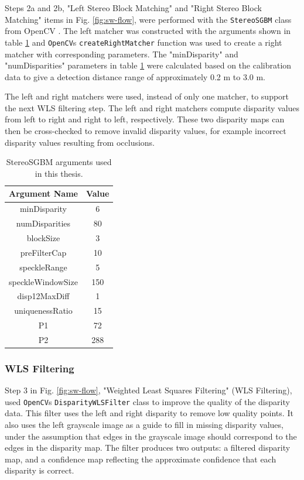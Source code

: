 Steps 2a and 2b, "Left Stereo Block Matching" and "Right Stereo Block Matching" items in Fig. \ref{fig:sw-flow}, were performed with 
the \texttt{StereoSGBM} class from OpenCV \cite{bradski_opencv_2000}. The left matcher was constructed with the arguments 
shown in table \ref{tab:stereo-args} and \texttt{OpenCV}s \texttt{createRightMatcher} function was used to create a right matcher 
with corresponding parameters. The "minDisparity" and "numDisparities" parameters in table \ref{tab:stereo-args} were calculated
based on the calibration data to give a detection distance range of approximately 0.2 m to 3.0 m.

The left and right matchers were used, instead of only one matcher, to support the next WLS filtering step. The left and right
matchers compute disparity values from left to right and right to left, respectively. These two disparity maps can then be cross-checked 
to remove invalid disparity values, for example incorrect disparity values resulting from occlusions. 

\begin{table}[H]
    \centering
    \caption{StereoSGBM arguments used in this thesis.}
    \label{tab:stereo-args}
    \begin{tabular}{|c||c|}
        \hline
        Argument Name & Value \\
        \hline
        minDisparity & 6 \\
        numDisparities & 80 \\
        blockSize & 3 \\
        preFilterCap & 10 \\
        speckleRange & 5 \\
        speckleWindowSize & 150 \\
        disp12MaxDiff & 1 \\
        uniquenessRatio & 15 \\
        P1 & 72 \\
        P2 & 288 \\
        \hline
    \end{tabular}
\end{table}

\subsubsection{WLS Filtering}

Step 3 in Fig. \ref{fig:sw-flow}, "Weighted Least Squares Filtering" (WLS Filtering), used \texttt{OpenCV}s \texttt{DisparityWLSFilter} class \cite{bradski_opencv_2000} 
to improve the quality of the disparity data.
This filter uses the left and right disparity to remove low quality points. It also uses the left grayscale image as a guide to fill in missing disparity values, under 
the assumption that edges in the grayscale image should correspond to the edges in the disparity map. The filter produces two outputs: a filtered disparity map, and a
confidence map reflecting the approximate confidence that each disparity is correct.

